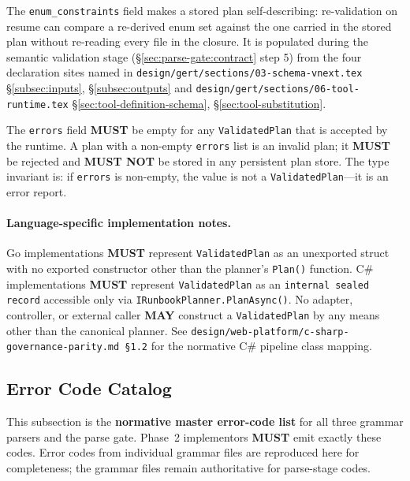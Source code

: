 The \texttt{enum\_constraints} field makes a stored plan self-describing:
re-validation on resume can compare a re-derived enum set against the one
carried in the stored plan without re-reading every file in the closure. It
is populated during the semantic validation stage (\S\ref{sec:parse-gate:contract}
step 5) from the four declaration sites named in
\texttt{design/gert/sections/03-schema-vnext.tex} \S\ref{subsec:inputs},
\S\ref{subsec:outputs} and \texttt{design/gert/sections/06-tool-runtime.tex}
\S\ref{sec:tool-definition-schema}, \S\ref{sec:tool-substitution}.

The \texttt{errors} field \textbf{MUST} be empty for any \texttt{ValidatedPlan}
that is accepted by the runtime.  A plan with a non-empty \texttt{errors} list
is an invalid plan; it \textbf{MUST} be rejected and \textbf{MUST NOT} be
stored in any persistent plan store.  The type invariant is: if
\texttt{errors} is non-empty, the value is not a \texttt{ValidatedPlan}---it
is an error report.

\paragraph{Language-specific implementation notes.}
Go implementations \textbf{MUST} represent \texttt{ValidatedPlan} as an
unexported struct with no exported constructor other than the planner's
\texttt{Plan()} function.  C\# implementations \textbf{MUST} represent
\texttt{ValidatedPlan} as an \texttt{internal sealed record} accessible only
via \texttt{IRunbookPlanner.PlanAsync()}.  No adapter, controller, or external
caller \textbf{MAY} construct a \texttt{ValidatedPlan} by any means other than
the canonical planner.  See
\texttt{design/web-platform/c-sharp-governance-parity.md~\S1.2} for the
normative C\# pipeline class mapping.

\subsection{Error Code Catalog}
\label{sec:parse-gate:error-codes}

This subsection is the \textbf{normative master error-code list} for all three
grammar parsers and the parse gate.  Phase~2 implementors \textbf{MUST} emit
exactly these codes.  Error codes from individual grammar files are reproduced
here for completeness; the grammar files remain authoritative for parse-stage
codes.

